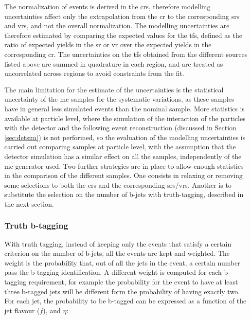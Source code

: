 The normalization of \ttbar events is derived in the \glspl{cr}, therefore modelling uncertainties affect only the extrapolation from 
the \gls{cr} to the corresponding \glspl{sr} and \glspl{vr}, and not the overall normalization. 
The modelling uncertainties are therefore estimated by comparing the expected values for the \glspl{tf}, defined as the ratio of expected yields in the \gls{sr} or \gls{vr} over the expected yields in the corresponding \gls{cr}. 
The uncertainties on the \glspl{tf} obtained from the different sources listed above are summed in quadrature in each region, and are treated as uncorrelated across regions to avoid 
constraints from the fit. 

The main limitation for the estimate of the uncertainties is the statistical uncertainty of the \gls{mc} samples for the systematic variations, as these samples have in general less simulated events than the nominal sample. 
More statistics is available at particle level, where the simulation of the interaction of the particles with the detector and the following event reconstruction (discussed in Section \ref{sec:detsim}) is not performed, so the evaluation of the \ttbar modelling uncertainties is carried out 
comparing samples at particle level, with the assumption that the detector simulation has a similar effect on all the samples, 
independently of the \gls{mc} generator used. Two further strategies are in place to allow enough statistics in the comparison of the different samples. 
One consists in relaxing or removing some selections to both the \glspl{cr} and the corresponding \glspl{sr}/\glspl{vr}. 
Another is to substitute the selection on the number of b-jets with truth-tagging, described in the next section.

\subsubsection*{Truth b-tagging}

With truth tagging, instead of keeping only the events that satisfy a certain criterion on the number of b-jets, all the events are kept and weighted. The weight is the probability that, out of all the jets in the event,
a certain number pass the b-tagging identification.
A different weight is computed for each b-tagging requirement, for example the probability for the event to have at least three b-tagged jets will be different form the probability of having exactly two. 
For each jet, the probability to be b-tagged can be expressed as a function of the jet flavour ($f$), \pt and $\eta$:

